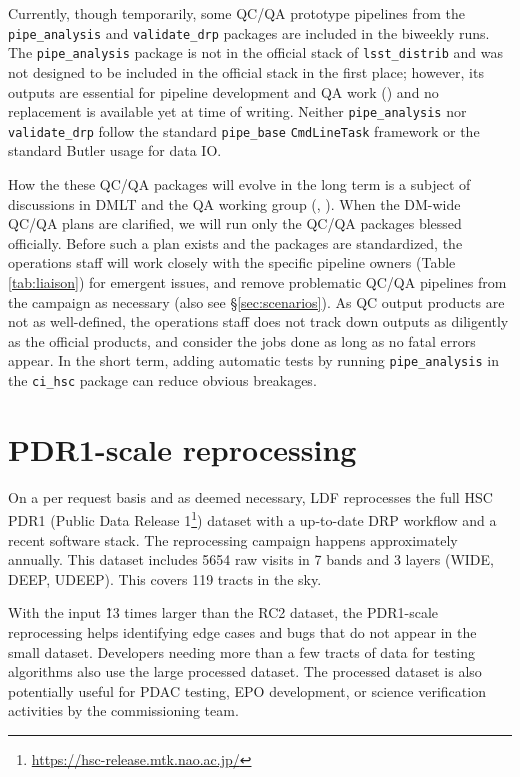 \documentclass[DM,authoryear,toc]{lsstdoc}
\begin{document}
Currently, though temporarily, some QC/QA prototype pipelines from the
\texttt{pipe\_analysis} and \texttt{validate\_drp} packages are included in
the biweekly runs. The \texttt{pipe\_analysis} package is not in the official
stack of \texttt{lsst\_distrib} and was not designed to be included in the
official stack in the first place; however, its outputs are essential
for pipeline development and QA work () and no replacement
is available yet at time of writing.  Neither \texttt{pipe\_analysis} nor
\texttt{validate\_drp} follow the standard \texttt{pipe\_base}
\texttt{CmdLineTask} framework or the standard Butler usage for data IO.

How the these QC/QA packages will evolve in the long term is a subject of
discussions in DMLT and the QA working group (, ).
When the DM-wide QC/QA plans are clarified, we will run only the QC/QA packages
blessed officially. Before such a plan exists and the packages are standardized,
the operations staff will work closely with the specific pipeline owners
(Table \ref{tab:liaison}) for emergent issues, and remove problematic
QC/QA pipelines from the campaign as necessary (also see \S \ref{sec:scenarios}).
As QC output products are not as well-defined, the operations
staff does not track down outputs as diligently as the official products,
and consider the jobs done as long as no fatal errors appear.  In
the short term, adding automatic tests by running \texttt{pipe\_analysis}
in the \texttt{ci\_hsc} package can reduce obvious breakages.

\section{PDR1-scale reprocessing}
\label{sec:pdr1}

On a per request basis and as deemed necessary, LDF reprocesses the
full HSC PDR1 (Public Data Release 1\footnote{\url{https://hsc-release.mtk.nao.ac.jp/}})
dataset with a up-to-date DRP
workflow and a recent software stack. The reprocessing campaign
happens approximately annually. This dataset includes 5654 raw
visits in 7 bands and 3 layers (WIDE, DEEP, UDEEP). This covers 119
tracts in the sky.

With the input \~13 times larger than the RC2 dataset, the PDR1-scale
reprocessing helps identifying edge cases and bugs that do not
appear in the small dataset.  Developers needing more than a few
tracts of data for testing algorithms also use the large processed
dataset. The processed dataset is also potentially useful for PDAC
testing, EPO development, or science verification activities by the
commissioning team.
\end{document}
